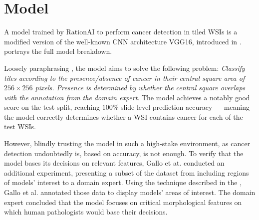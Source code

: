 \section{Model}\label{model}

A model trained by RationAI to perform cancer detection in tiled WSIs is a modified version of the well-known CNN architecture VGG16, introduced in \cite{vgg16}.
 portrays the full model breakdown.

Loosely paraphrasing \cite{gallo}, the model aims to solve the following problem: \emph{Classify tiles according to the presence/absence of cancer in their central square area of $256 \times 256 $ pixels. Presence is determined by whether the central square overlaps with the annotation from the domain expert}. The model achieves a notably good score on the test split, reaching $100$\% slide-level prediction accuracy --- meaning the model correctly determines whether a WSI contains cancer for each of the test WSIs.

However, blindly trusting the model in such a high-stake environment, as cancer detection undoubtedly is, based on accuracy, is not enough.
To verify that the model bases its decisions on relevant features, Gallo et at. conducted an additional experiment, presenting a subset of the dataset from  including regions of models' interest to a domain expert.
Using the technique described in the , Gallo et al. annotated those data to display models' areas of interest.
The domain expert concluded that the model focuses on critical morphological features \cite{gallo} on which human pathologists would base their decisions.

